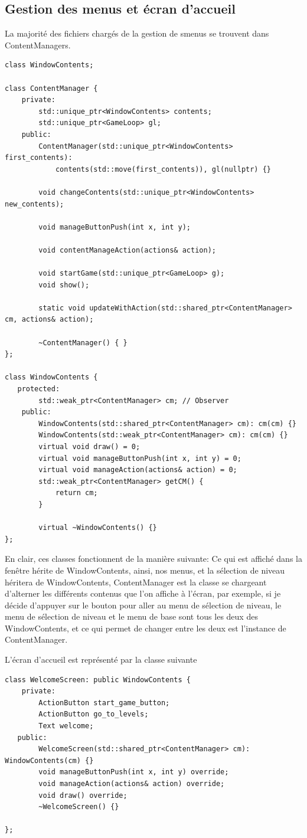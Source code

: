 \documentclass[a4paper, 12pt]{article}
\begin{document}
\subsection{Gestion des menus et écran d'accueil}
La majorité des fichiers chargés de la gestion de smenus se trouvent dans ContentManagers.
\begin{lstlisting}
class WindowContents;

class ContentManager {
    private:
        std::unique_ptr<WindowContents> contents;
        std::unique_ptr<GameLoop> gl;
    public:
        ContentManager(std::unique_ptr<WindowContents> first_contents):
            contents(std::move(first_contents)), gl(nullptr) {}

        void changeContents(std::unique_ptr<WindowContents> new_contents);

        void manageButtonPush(int x, int y);

        void contentManageAction(actions& action);

        void startGame(std::unique_ptr<GameLoop> g);
        void show();

        static void updateWithAction(std::shared_ptr<ContentManager> cm, actions& action);

        ~ContentManager() { }
};

class WindowContents {
   protected:
        std::weak_ptr<ContentManager> cm; // Observer
    public:
        WindowContents(std::shared_ptr<ContentManager> cm): cm(cm) {}
        WindowContents(std::weak_ptr<ContentManager> cm): cm(cm) {}
        virtual void draw() = 0;
        virtual void manageButtonPush(int x, int y) = 0;
        virtual void manageAction(actions& action) = 0;
        std::weak_ptr<ContentManager> getCM() {
            return cm;
        }

        virtual ~WindowContents() {}
};
\end{lstlisting}
En clair, ces classes fonctionnent de la manière suivante:
Ce qui est affiché dans la fenêtre hérite de WindowContents, ainsi, nos menus, et la sélection de niveau héritera de WindowContents, ContentManager est la classe se chargeant d'alterner les différents contenus que l'on affiche à l'écran,
par exemple, si je décide d'appuyer sur le bouton pour aller au menu de sélection de niveau, le menu de sélection de niveau et le menu de base sont tous les deux des WindowContents, et ce qui permet de changer entre les deux est l'instance de ContentManager.

L'écran d'accueil est représenté par la classe suivante
\begin{lstlisting}
class WelcomeScreen: public WindowContents {
    private:
        ActionButton start_game_button;
        ActionButton go_to_levels;
        Text welcome;
   public:
        WelcomeScreen(std::shared_ptr<ContentManager> cm): WindowContents(cm) {}
        void manageButtonPush(int x, int y) override;
        void manageAction(actions& action) override;
        void draw() override;
        ~WelcomeScreen() {}

};
\end{lstlisting}
\end{document}
